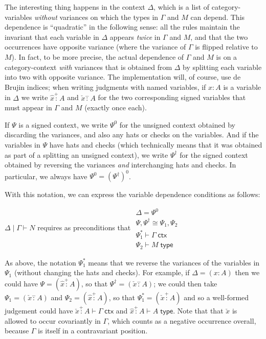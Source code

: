 \documentclass{amsart}
\let\types\vdash %
\def\cb{\mid} %
\def\type{\;\mathsf{type}}
\def\ctx{\;\mathsf{ctx}}
\let\splits\rightrightarrows
\def\flip#1{#1^*} %
\def\dual#1{#1^\dagger} %
\def\pcol{\overset{\scriptscriptstyle +}{:}}
\def\mcol{\overset{\scriptscriptstyle -}{:}}
\newcommand{\unsigned}[1]{#1^0}
\begin{document}
The interesting thing happens in the context $\Delta$, which is a list of category-variables \emph{without} variances on which the types in $\Gamma$ and $M$ can depend.
This dependence is ``quadratic'' in the following sense: all the rules maintain the invariant that each variable in $\Delta$ appears \emph{twice} in $\Gamma$ and $M$, and that the two occurrences have opposite variance (where the variance of $\Gamma$ is flipped relative to $M$).
In fact, to be more precise, the actual dependence of $\Gamma$ and $M$ is on a category-context \emph{with} variances that is obtained from $\Delta$ by splitting each variable into two with opposite variance.
The implementation will, of course, use de Brujin indices; when writing judgments with named variables, if $x:A$ is a variable in $\Delta$ we write $\hat{x}\pcol A$ and $\check{x}\mcol A$ for the two corresponding signed variables that must appear in $\Gamma$ and $M$ (exactly once each).

If $\Psi$ is a signed context, we write $\unsigned{\Psi}$ for the unsigned context obtained by discarding the variances, and also any hats or checks on the variables.
And if the variables in $\Psi$ have hats and checks (which technically means that it was obtained as part of a splitting an unsigned context), we write $\dual\Psi$ for the signed context obtained by reversing the variances \emph{and} interchanging hats and checks.
In particular, we always have $\unsigned{\Psi} = \unsigned{(\dual\Psi)}$. %

With this notation, we can express the variable dependence conditions as follows:
\begin{center}
  $\Delta\cb\Gamma\types N$ requires as preconditions that
  $\begin{array}{c}
     \Delta = \unsigned{\Psi}\\
     \Psi, \dual\Psi \cong \Psi_1,\Psi_2\\
     \flip{\Psi_1} \types \Gamma \ctx\\
     \Psi_2 \types M \type
  \end{array}$
\end{center}
As above, the notation $\flip{\Psi_1}$ means that we reverse the variances of the variables in $\Psi_1$ (without changing the hats and checks).
For example, if $\Delta = (x:A)$ then we could have $\Psi = (\hat x\pcol A)$, so that $\dual\Psi = (\check x\mcol A)$; we could then take $\Psi_1 = (\check x\mcol A)$ and $\Psi_2=(\hat x\pcol A)$, so that $\flip\Psi_1 = (\check x\pcol A)$ and so a well-formed judgement could have $\check x \pcol A \types \Gamma \ctx$ and $\hat x \pcol A \types A \type$.
Note that that $\check{x}$ is allowed to occur covariantly in $\Gamma$, which counts as a negative occurrence overall, because $\Gamma$ is itself in a contravariant position.
\end{document}
